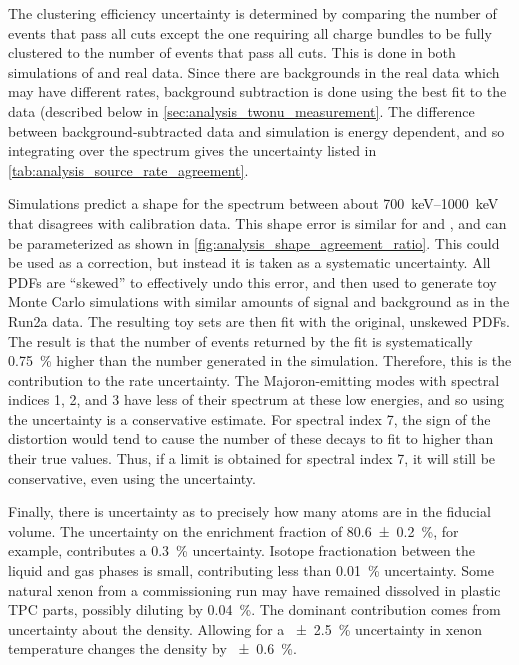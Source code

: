 \documentclass[herrin-thesis.tex]{subfiles}
\begin{document}
The clustering efficiency uncertainty is determined by comparing the number of events that pass all cuts except the one requiring all charge bundles to be fully clustered to the number of events that pass all cuts. This is done in both simulations of \twonu{} and real data. Since there are backgrounds in the real data which may have different rates, background subtraction is done using the best fit to the data (described below in \cref{sec:analysis_twonu_measurement}. The difference between background-subtracted data and simulation is energy dependent, and so integrating over the \twonu{} spectrum gives the uncertainty listed in \cref{tab:analysis_source_rate_agreement}.

Simulations predict a shape for the spectrum between about \SIrange{700}{1000}{\keV} that disagrees with calibration data. This shape error is similar for  and , and can be parameterized as shown in \cref{fig:analysis_shape_agreement_ratio}. This could be used as a correction, but instead it is taken as a systematic uncertainty. All PDFs are ``skewed'' to effectively undo this error, and then used to generate toy Monte Carlo simulations with similar amounts of signal and background as in the Run2a data. The resulting toy sets are then fit with the original, unskewed PDFs. The result is that the number of \twonu{} events returned by the fit is systematically \SI{0.75}{\percent} higher than the number generated in the simulation. Therefore, this is the contribution to the \twonu{} rate uncertainty. The Majoron-emitting modes with spectral indices 1, 2, and 3 have less of their spectrum at these low energies, and so using the \twonu{} uncertainty is a conservative estimate. For spectral index 7, the sign of the distortion would tend to cause the number of these decays to fit to higher than their true values. Thus, if a limit is obtained for spectral index 7, it will still be conservative, even using the \twonu{} uncertainty.

Finally, there is uncertainty as to precisely how many  atoms are in the fiducial volume. The uncertainty on the enrichment fraction of \SI{80.6\pm0.2}{\percent}, for example, contributes a \SI{0.3}{\percent} uncertainty. Isotope fractionation between the liquid and gas phases is small, contributing less than \SI{0.01}{\percent} uncertainty. Some natural xenon from a commissioning run may have remained dissolved in plastic TPC parts, possibly diluting  by \SI{0.04}{\percent}. The dominant contribution comes from uncertainty about the density. Allowing for a \SI{\pm2.5}{\percent} uncertainty in xenon temperature changes the density by \SI{\pm0.6}{\percent}.
\end{document}
